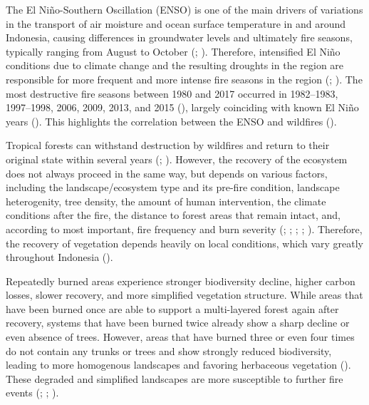 \documentclass[
  fontsize=12pt,
  paper=a4,
  parskip=half,
  headings=big,
  DIV=12
]{scrreprt}
\begin{document}
The El Niño-Southern Oscillation (ENSO) is one of the main drivers of variations in the transport of air moisture and ocean surface temperature in and around Indonesia, causing differences in groundwater levels and ultimately fire seasons, typically ranging from August to October (\cite{grosvenor_catastrophic_2024}; \cite{schmidt_fire_2024}). Therefore, intensified El Niño conditions due to climate change and the resulting droughts in the region are responsible for more frequent and more intense fire seasons in the region (\cite{schmidt_fire_2024}; \cite{setiawan_spatio-temporal_2025}). The most destructive fire seasons between 1980 and 2017 occurred in 1982–1983, 1997–1998, 2006, 2009, 2013, and 2015 (\cite{kiely_new_2019}), largely coinciding with known El Niño years (\cite{gan_greenhouse_2023}). This highlights the correlation between the ENSO and wildfires (\cite{schmidt_fire_2024}).

Tropical forests can withstand destruction by wildfires and return to their original state within several years (\cite{harrison_impacts_2024}; \cite{setiawan_spatio-temporal_2025}). However, the recovery of the ecosystem does not always proceed in the same way, but depends on various factors, including the landscape/ecosystem type and its pre-fire condition, landscape heterogenity, tree density, the amount of human intervention, the climate conditions after the fire, the distance to forest areas that remain intact, and, according to \textcite{hoscilo_development_2008} most important, fire frequency and burn severity (\cite{harrison_impacts_2024}; \cite{hoscilo_development_2008}; \cite{schmidt_fire_2024}; \cite{setiawan_spatio-temporal_2025}; \cite{xu_global_2024}). Therefore, the recovery of vegetation depends heavily on local conditions, which vary greatly throughout Indonesia (\cite{setiawan_spatio-temporal_2025}).

Repeatedly burned areas experience stronger biodiversity decline, higher carbon losses, slower recovery, and more simplified vegetation structure. While areas that have been burned once are able to support a multi-layered forest again after recovery, systems that have been burned twice already show a sharp decline or even absence of trees. However, areas that have burned three or even four times do not contain any trunks or trees and show strongly reduced biodiversity, leading to more homogenous landscapes and favoring herbaceous vegetation (\cite{setiawan_spatio-temporal_2025}). These degraded and simplified landscapes are more susceptible to further fire events (\cite{harrison_impacts_2024}; \cite{schmidt_fire_2024}; \cite{setiawan_spatio-temporal_2025}).
\end{document}
